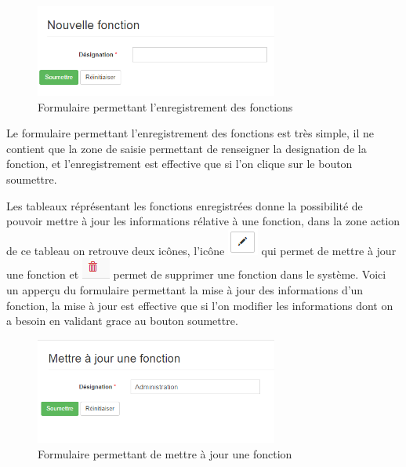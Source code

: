\documentclass[12pt,a4paper]{report}
\begin{document}
\begin{figure}[h]
\begin{center}
\includegraphics[width=8cm]{pic/FormAddFonction.png}
\end{center}
\caption{Formulaire permettant l'enregistrement des fonctions}
\label{Formulaire permettant l'enregistrement des fonctions}
\end{figure} 

Le formulaire permettant l'enregistrement des fonctions est très simple, il ne contient que la zone de saisie permettant de renseigner la designation de la fonction, et l'enregistrement est effective que si l'on clique sur le bouton soumettre. 

Les tableaux réprésentant les fonctions enregistrées donne la possibilité de pouvoir mettre à jour les informations rélative à une fonction, dans la zone action de ce tableau on retrouve deux icônes, l'icône \includegraphics[scale=0.7]{pic/EditBlack.png} qui permet de mettre à jour une fonction et \includegraphics[scale=0.7]{pic/DeleteWRed.png} permet de supprimer une fonction dans le système.
Voici un apperçu du formulaire permettant la mise à jour des informations d'un fonction, la mise à jour est effective que si l'on modifier les informations dont on a besoin en validant grace au bouton soumettre. 

\begin{figure}[h]
\begin{center}
\includegraphics[width=8cm]{pic/MettreAJFonction.png}
\end{center}
\caption{Formulaire permettant de mettre à jour une fonction}
\label{Formulaire permettant de mettre à jour une fonction}
\end{figure} 
\end{document}
